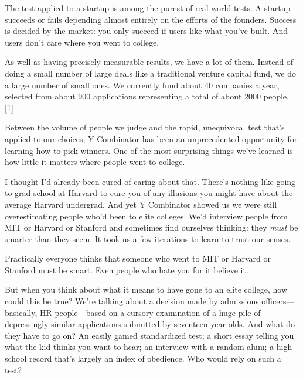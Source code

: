 The test applied to a startup is among the
                  purest of real world tests. A startup succeeds or fails
                  depending almost entirely on the efforts of the founders.
                  Success is decided by the market: you only succeed if users
                  like what you've built. And users don't care where you went to
                  college.

As well as having precisely measurable
                  results, we have a lot of them. Instead of doing a small
                  number of large deals like a traditional venture capital fund,
                  we do a large number of small ones. We currently fund about 40
                  companies a year, selected from about 900 applications
                  representing a total of about 2000 people.
                  [\href{\#f1n}{1}]

Between the volume of people we judge and the
                  rapid, unequivocal test that's applied to our choices, Y
                  Combinator has been an unprecedented opportunity for learning
                  how to pick winners. One of the most surprising things we've
                  learned is how little it matters where people went to
                  college.

I thought I'd already been cured of caring
                  about that. There's nothing like going to grad school at
                  Harvard to cure you of any illusions you might have about the
                  average Harvard undergrad. And yet Y Combinator showed us we
                  were still overestimating people who'd been to elite colleges.
                  We'd interview people from MIT or Harvard or Stanford and
                  sometimes find ourselves thinking: they \emph{must} be smarter
                  than they seem. It took us a few iterations to learn to trust
                  our senses.

Practically everyone thinks that
                  someone who went to MIT or Harvard or Stanford must be smart.
                  Even people who hate you for it believe it.

But
                  when you think about what it means to have gone to an elite
                  college, how could this be true? We're talking about a
                  decision made by admissions officers---basically, HR
                  people---based on a cursory examination of a huge pile of
                  depressingly similar applications submitted by seventeen year
                  olds. And what do they have to go on? An easily gamed
                  standardized test; a short essay telling you what the kid
                  thinks you want to hear; an interview with a random alum; a
                  high school record that's largely an index of obedience. Who
                  would rely on such a test?


